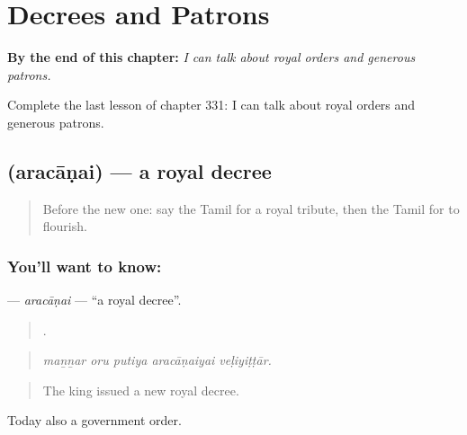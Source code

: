 
\chapter{Decrees and Patrons}
\label{ch:ta-decrees-and-patrons}

\begin{chapteropening}
\textbf{By the end of this chapter:} \emph{I can talk about royal orders and generous patrons.}

Complete the last lesson of chapter 331: I can talk about royal orders and generous patrons.
\end{chapteropening}

\section[\texorpdfstring{\ta{அரசாணை} (aracāṇai)}{அரசாணை (aracāṇai)}]{ (aracāṇai) — a royal decree}

\label{lesson:TA-C331-aracanai}



\begin{quote}
Before the new one: say the Tamil for a royal tribute, then the Tamil for to flourish.
\end{quote}

\subsection*{You'll want to know: }
\textbf{} — \emph{aracāṇai} — \textquotedblleft{}a royal decree\textquotedblright{}.

\begin{quote}
    .
\end{quote}

\begin{quote}
\emph{maṉṉar oru putiya aracāṇaiyai veḷiyiṭṭār.}
\end{quote}

\begin{quote}
The king issued a new royal decree.
\end{quote}

Today also a government order.

